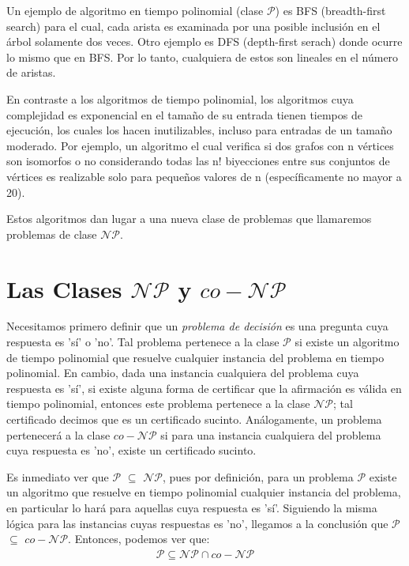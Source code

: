 \documentclass{article}
\begin{document}
Un ejemplo de algoritmo en tiempo polinomial (clase $\mathcal{P}$)
es BFS (breadth-first search) para el cual, cada arista es examinada por una posible
inclusión en el árbol solamente dos veces. Otro ejemplo es DFS (depth-first serach)
donde ocurre lo mismo que en BFS. Por lo tanto, cualquiera de estos son
lineales en el número de aristas.

En contraste a los algoritmos de tiempo polinomial, los
algoritmos cuya complejidad es exponencial en el tamaño de su
entrada tienen tiempos de ejecución, los cuales los hacen inutilizables,
incluso para entradas de un tamaño moderado. Por ejemplo, un algoritmo
el cual verifica si dos grafos con n vértices son isomorfos o no 
considerando todas las n! biyecciones entre sus conjuntos de vértices es
realizable solo para pequeños valores de n (específicamente no mayor a 20).

Estos algoritmos dan lugar a una nueva clase de problemas que llamaremos
problemas de clase $\mathcal{N}\mathcal{P}$.

\section*{Las Clases $\mathcal{N}\mathcal{P}$ y
$co-\mathcal{N}\mathcal{P}$}
Necesitamos primero definir que un \textit{problema de decisión}
es una pregunta cuya respuesta es 'sí' o 'no'. Tal problema pertenece
a la clase $\mathcal{P}$ si existe un algoritmo de tiempo
polinomial que resuelve cualquier instancia del problema en tiempo
polinomial. En cambio, dada una instancia
cualquiera del problema cuya respuesta es 'sí', si existe alguna forma de 
certificar que la afirmación es válida en tiempo polinomial, entonces este problema
pertenece a la clase $\mathcal{N}\mathcal{P}$; tal certificado decimos
que es un certificado sucinto. Análogamente,
un problema pertenecerá a la clase $co-\mathcal{N}\mathcal{P}$ si para
una instancia cualquiera del problema cuya respuesta es 'no', existe un
certificado sucinto.

Es inmediato ver que 
$\mathcal{P}$ $\subseteq$ \textit{$\mathcal{N}\mathcal{P}$},
pues por definición, para un problema $\mathcal{P}$ existe
un algoritmo que resuelve en tiempo polinomial cualquier instancia
del problema, en particular lo hará para aquellas cuya respuesta es
'sí'. Siguiendo la misma lógica para las instancias cuyas respuestas
es 'no', llegamos a la conclusión que $\mathcal{P}$
$\subseteq$ $co-\mathcal{N}\mathcal{P}$. Entonces, podemos
ver que:
\begin{align*}
    \mathcal{P} \subseteq \mathcal{N}\mathcal{P}
    \cap co-\mathcal{N}\mathcal{P}
\end{align*}
\end{document}
